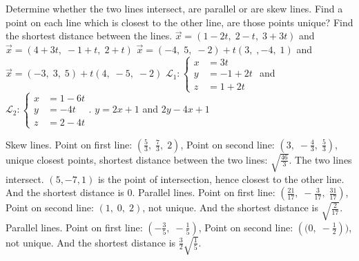 
\begin{Exercise}[
name={},
title={}, 
difficulty=0,
origin={\cite{YL}}]
Determine whether the two lines intersect, are parallel or are skew lines.  Find a point on each line which is closest to the other line, are those points unique?  Find the shortest distance between the lines.
\Question $\vec{x}=(1-2t,\;2-t,\;3+3t)$ and $\vec{x}=(4+3t,\; -1+t,\; 2+t)$
\Question $\vec{x}=(-4,\;5,\;-2)+t(3,\;,-4,\; 1)$ and $\vec{x}=(-3,\; 3,\; 5)+t(4,\;-5,\;-2)$
\Question $\mathcal{L}_1: \left\{\begin{aligned} x&=3t\\y&=-1+2t\\z&=1+2t\end{aligned}\right.$ and 
$\mathcal{L}_2: \left\{\begin{aligned} x&=1-6t\\y&=-4t\\z&=2-4t\end{aligned}\right.$.
\Question $y=2x+1$ and $2y-4x+1$

\end{Exercise}
\begin{Answer}
\Question Skew lines. 
Point on first line: $\left(\frac{5}{3},\; \frac{7}{3},\; 2\right)$, Point on second line: $\left(3,\; -\frac{4}{3},\; \frac{5}{3}\right)$, unique closest points, shortest distance between the two lines: $\sqrt{\frac{46}{3}}$.
\Question The two lines intersect. $(5, -7, 1)$ is the point of intersection, hence closest to the other line.  And the shortest distance is $0$.
\Question Parallel lines. Point on first line: $\left(\frac{21}{17},\; -\frac{3}{17},\; \frac{31}{17}\right)$, Point on second line: $\left(1,\; 0,\; 2\right)$, not unique. And the shortest distance is $\sqrt{\frac{2}{17}}$.
\Question Parallel lines. 
Point on first line: $\left(-\frac{3}{5},\; -\frac{1}{5}\right)$, Point on second line: $\left((0,\; -\frac{1}{2}\right))$, not unique. And the shortest distance is $\frac{3}{2}\sqrt{\frac{1}{5}}$.
\end{Answer}
